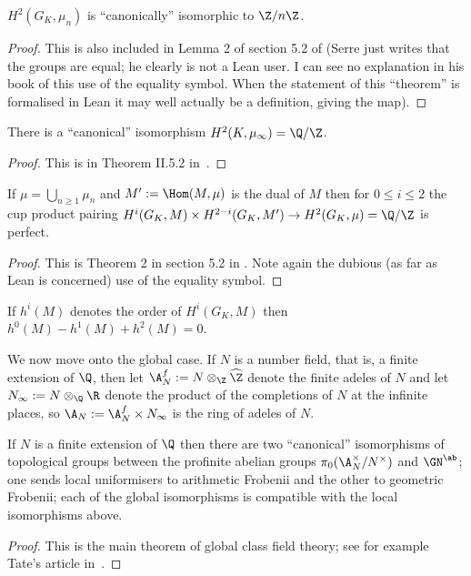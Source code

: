 \begin{theorem} 
    \label{local_galois_coh_top_degree}
    \notready
    $H^2(G_K,\mu_n)$ is ``canonically'' isomorphic to $\Z/n\Z$.
\end{theorem}
\begin{proof} This is also included in Lemma 2 of section 5.2 of \cite{serre-galcoh} (Serre just writes that the groups are equal; he clearly is not a Lean user. I can see no explanation in his book of this use of the equality symbol. When the statement of this ``theorem'' is formalised in Lean it may well actually be a definition, giving the map).
\end{proof}

\begin{theorem}\notready There is a ``canonical'' isomorphism $H^2(K,\mu_\infty)=\Q/\Z$.
\end{theorem}
\begin{proof}\notready
This is in Theorem II.5.2 in~\cite{serre-galcoh}.
\end{proof}

\begin{theorem} \label{local_galois_coh_poincare}\notready
    If $\mu=\bigcup_{n\geq1}\mu_n$ and $M':=\Hom(M,\mu)$ is the dual of $M$ then for
    $0\leq i\leq 2$ the cup product pairing $H^i(G_K,M)\times H^{2-i}(G_K,M')\to H^2(G_K,\mu)=\Q/\Z$ is perfect.
\end{theorem}
\begin{proof}\notready This is Theorem 2 in section 5.2 in \cite{serre-galcoh}. Note again
    the dubious (as far as Lean is concerned) use of the equality symbol.
\end{proof}

\begin{theorem} \label{local_galois_coh_euler_poincare}\notready
    If $h^i(M)$ denotes the order of $H^i(G_K,M)$ then $h^0(M)-h^1(M)+h^2(M)=0$.
\end{theorem}

We now move onto the global case. If $N$ is a number field, that is, a finite extension of $\Q$,
then let $\A_N^f:= N\otimes_{\Z}\widehat{\Z}$
denote the finite adeles of $N$ and let $N_\infty := N\otimes_{\Q}\R$ denote the product of the completions of $N$ at the infinite places, so $\A_N:=\A_N^f\times N_\infty$ is the ring of adeles of $N$.

\begin{theorem}\label{global_class_field_theory}\notready If $N$ is a finite extension of $\Q$ then there are two ``canonical'' isomorphisms of topological groups between the profinite abelian groups $\pi_0(\A_N^\times/N^\times)$ and $\GN^{\ab}$; one sends local uniformisers to arithmetic Frobenii and the other to geometric Frobenii; each of the global isomorphisms is compatible with the local isomorphisms above.
\end{theorem}
\begin{proof}\notready This is the main theorem of global class field theory; see for example Tate's article in~\cite{cf}.
\end{proof}

